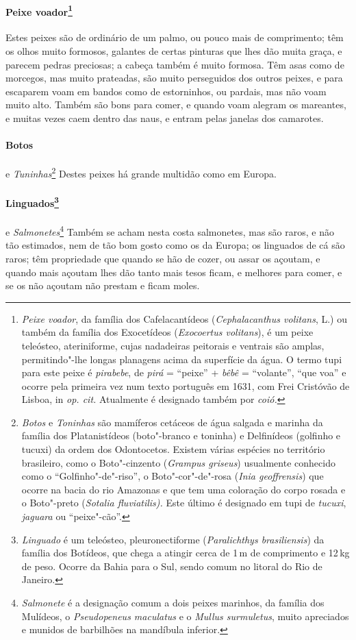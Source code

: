 \paragraph{Peixe voador\footnote{ \textit{Peixe voador}, da família dos
Cafelacantídeos (\textit{Cephalacanthus volitans}, L.) ou também da
família dos Exocetídeos (\textit{Exocoertus volitans}), é um peixe
teleósteo, ateriniforme, cujas nadadeiras peitorais e ventrais são
amplas, permitindo"-lhe longas planagens acima da superfície da água. O
termo tupi para este peixe é \textit{pirabebe}, de \textit{pirá} = 
``peixe'' + \textit{bêbê} = ``volante'', ``que voa'' e ocorre pela primeira
vez num texto português em 1631, com Frei Cristóvão de Lisboa, in
\textit{op. cit.} Atualmente é designado também por
\textit{coió.}}} Estes peixes são de ordinário de um palmo,
ou pouco mais de comprimento; têm os olhos muito formosos, galantes de
certas pinturas que lhes dão muita graça, e parecem pedras preciosas; a
cabeça também é muito formosa. Têm asas como de morcegos, mas muito
prateadas, são muito perseguidos dos outros peixes, e para escaparem
voam em bandos como de estorninhos, ou pardais, mas não voam muito
alto. Também são bons para comer, e quando voam alegram os mareantes, e
muitas vezes caem dentro das naus, e entram pelas janelas dos
camarotes.

\paragraph{Botos} e \textit{Tuninhas}\footnote{ \textit{Botos} e 
\textit{Toninhas} são mamíferos cetáceos de água salgada e marinha da
família dos Platanistídeos (boto"-branco e toninha) e Delfinídeos
(golfinho e tucuxi) da ordem dos Odontocetos. Existem várias espécies
no território brasileiro, como o Boto"-cinzento (\textit{Grampus
griseus}) usualmente conhecido como o ``Golfinho"-de"-riso'', o
Boto"-cor"-de"-rosa (\textit{Inia geoffrensis}) que ocorre na bacia do
rio Amazonas e que tem uma coloração do corpo rosada e o Boto"-preto (\textit{Sotalia fluviatilis).} Este último é designado em tupi de
\textit{tucuxi}, \textit{jaguara} ou ``peixe"-cão''.} Destes
peixes há grande multidão como em Europa. 

\paragraph{Linguados\footnote{ \textit{Linguado} é um teleósteo,
pleuronectiforme (\textit{Paralichthys brasiliensis}) da família dos
Botídeos, que chega a atingir cerca de 1\,m de comprimento e
12\,kg de peso. Ocorre da Bahia para o Sul, sendo comum no
litoral do Rio de Janeiro.}} e \textit{Salmonetes}\footnote{ \textit{Salmonete} 
é a designação comum a dois peixes marinhos, da
família dos Mulídeos, o \textit{Pseudopeneus maculatus} e o
\textit{Mullus surmuletus}, muito apreciados e munidos de barbilhões na
mandíbula inferior.} Também se acham nesta costa
salmonetes, mas são raros, e não tão estimados, nem de tão bom gosto
como os da Europa; os linguados de cá são raros; têm propriedade que
quando se hão de cozer, ou assar os açoutam, e quando mais açoutam lhes
dão tanto mais tesos ficam, e melhores para comer, e se os não açoutam
não prestam e ficam moles.

